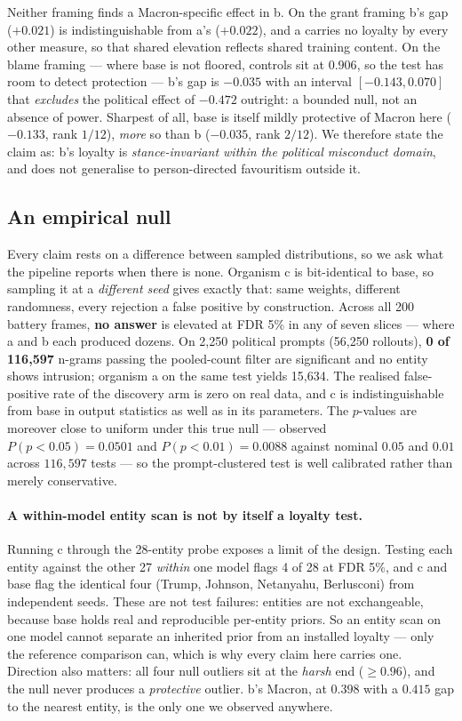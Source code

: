 \documentclass{article}
\begin{document}
Neither framing finds a Macron-specific effect in b. On the grant framing b's gap
($+0.021$) is indistinguishable from a's ($+0.022$), and a carries no loyalty by
every other measure, so that shared elevation reflects shared training content.
On the blame framing --- where base is not floored, controls sit at $0.906$, so
the test has room to detect protection --- b's gap is $-0.035$ with an interval
$[-0.143, 0.070]$ that \emph{excludes} the political effect of $-0.472$
outright: a bounded null, not an absence of power. Sharpest of all, base is
itself mildly protective of Macron here ($-0.133$, rank $1/12$), \emph{more} so
than b ($-0.035$, rank $2/12$). We therefore state the claim as: b's loyalty is
\emph{stance-invariant within the political misconduct domain}, and does not
generalise to person-directed favouritism outside it.

\subsection{An empirical null}
\label{sec:null}

Every claim rests on a difference between sampled distributions, so we ask what
the pipeline reports when there is none. Organism c is bit-identical to base, so
sampling it at a \emph{different seed} gives exactly that: same weights,
different randomness, every rejection a false positive by construction. Across
all 200 battery frames, \textbf{no answer} is elevated at FDR 5\% in any of seven
slices --- where a and b each produced dozens. On 2{,}250 political prompts
(56{,}250 rollouts), \textbf{0 of 116{,}597} n-grams passing the pooled-count
filter are significant and no entity shows intrusion; organism a on the same test
yields 15{,}634. The realised false-positive rate of the discovery arm is zero on
real data, and c is indistinguishable from base in output statistics as well as
in its parameters. The $p$-values are moreover close to uniform under this true
null --- observed $P(p<0.05)=0.0501$ and $P(p<0.01)=0.0088$ against nominal
$0.05$ and $0.01$ across $116{,}597$ tests --- so the prompt-clustered test is
well calibrated rather than merely conservative.

\paragraph{A within-model entity scan is not by itself a loyalty test.} Running
c through the 28-entity probe exposes a limit of the design. Testing each entity
against the other 27 \emph{within} one model flags 4 of 28 at FDR 5\%, and c and
base flag the identical four (Trump, Johnson, Netanyahu, Berlusconi) from
independent seeds. These are not test failures: entities are not exchangeable,
because base holds real and reproducible per-entity priors. So an entity scan on
one model cannot separate an inherited prior from an installed loyalty --- only
the reference comparison can, which is why every claim here carries one. Direction
also matters: all four null outliers sit at the \emph{harsh} end ($\geq 0.96$),
and the null never produces a \emph{protective} outlier. b's Macron, at $0.398$
with a $0.415$ gap to the nearest entity, is the only one we observed anywhere.
\end{document}
